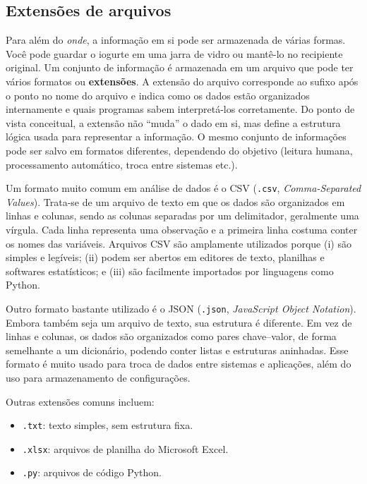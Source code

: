 \documentclass[
  brazilian,
  letterpaper,
  DIV=11,
  numbers=noendperiod]{scrreprt}
\providecommand{\tightlist}{%
  \setlength{\itemsep}{0pt}\setlength{\parskip}{0pt}}
\begin{document}
\subsection{Extensões de arquivos}\label{extensuxf5es-de-arquivos}

Para além do \emph{onde}, a informação em si pode ser armazenada de
várias formas. Você pode guardar o iogurte em uma jarra de vidro ou
mantê-lo no recipiente original. Um conjunto de informação é armazenada
em um arquivo que pode ter vários formatos ou \textbf{extensões}. A
extensão do arquivo corresponde ao sufixo após o ponto no nome do
arquivo e indica como os dados estão organizados internamente e quais
programas sabem interpretá-los corretamente. Do ponto de vista
conceitual, a extensão não ``muda'' o dado em si, mas define a estrutura
lógica usada para representar a informação. O mesmo conjunto de
informações pode ser salvo em formatos diferentes, dependendo do
objetivo (leitura humana, processamento automático, troca entre sistemas
etc.).

Um formato muito comum em análise de dados é o CSV (\texttt{.csv},
\emph{Comma-Separated Values}). Trata-se de um arquivo de texto em que
os dados são organizados em linhas e colunas, sendo as colunas separadas
por um delimitador, geralmente uma vírgula. Cada linha representa uma
observação e a primeira linha costuma conter os nomes das variáveis.
Arquivos CSV são amplamente utilizados porque (i) são simples e
legíveis; (ii) podem ser abertos em editores de texto, planilhas e
softwares estatísticos; e (iii) são facilmente importados por linguagens
como Python.

Outro formato bastante utilizado é o JSON (\texttt{.json},
\emph{JavaScript Object Notation}). Embora também seja um arquivo de
texto, sua estrutura é diferente. Em vez de linhas e colunas, os dados
são organizados como pares chave--valor, de forma semelhante a um
dicionário, podendo conter listas e estruturas aninhadas. Esse formato é
muito usado para troca de dados entre sistemas e aplicações, além do uso
para armazenamento de configurações.

Outras extensões comuns incluem:

\begin{itemize}
\tightlist
\item
  \texttt{.txt}: texto simples, sem estrutura fixa.
\item
  \texttt{.xlsx}: arquivos de planilha do Microsoft Excel.
\item
  \texttt{.py}: arquivos de código Python.
\end{itemize}
\end{document}
